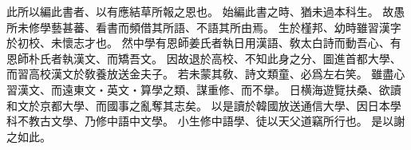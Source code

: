 此所以編此書者、以有應結草所報之恩也。
始編此書之時、猶未過本科生。
故愚所未修學藝甚蕃、看書而頻借其所語、不語其所由焉。
生於槿邦、幼時雖習漢字於初校、未懷志才也。
然中學有恩師姜氏者執日用漢語、敎太白詩而動吾心、有恩師朴氏者執漢文、而矯吾文。
因故退於高校、不知此身之分、圖進首都大學、而習高校漢文於敎養放送金夫子。
若未蒙其敎、詩文類童、必爲左右笑。
雖盡心習漢文、而遠東文・英文・算學之類、謀重修、而不擧。
日横海遊覽扶桑、欲讀和文於京都大學、而國事之亂奪其志矣。
以是讀於韓國放送通信大學、因日本學科不教古文學、乃修中語中文學。
小生修中語學、徒以天父道竊所行也。
是以謝之如此。
